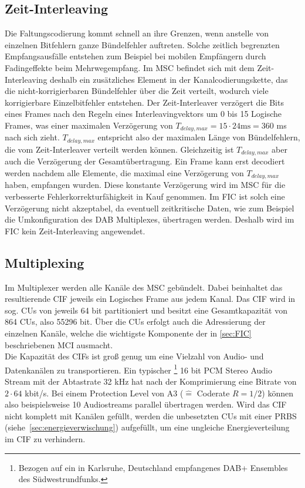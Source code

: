 \subsection{Zeit-Interleaving}
\label{sec:time_interleaving_std}
Die Faltungscodierung kommt schnell an ihre Grenzen, wenn anstelle von einzelnen Bitfehlern ganze Bündelfehler auftreten. Solche zeitlich begrenzten Empfangsausfälle entstehen zum Beispiel bei mobilen Empfängern durch Fadingeffekte beim Mehrwegempfang. Im \ac{MSC} befindet sich mit dem Zeit-Interleaving deshalb ein zusätzliches Element in der Kanalcodierungskette, das die nicht-korrigierbaren Bündelfehler über die Zeit verteilt, wodurch viele korrigierbare Einzelbitfehler entstehen. Der Zeit-Interleaver verzögert die Bits eines Frames nach den Regeln eines Interleavingvektors um 0 bis 15 Logische Frames, was einer maximalen Verzögerung von $T_{delay, max} = 15 \cdot 24 \text{ms} = 360$ ms nach sich zieht. $T_{delay, max}$ entspricht also der maximalen Länge von Bündelfehlern, die vom Zeit-Interleaver verteilt werden können. Gleichzeitig ist $T_{delay, max}$ aber auch die Verzögerung der Gesamtübertragung. Ein Frame kann erst decodiert werden nachdem alle Elemente, die maximal eine Verzögerung von $T_{delay, max}$ haben, empfangen wurden. Diese konstante Verzögerung wird im MSC für die verbesserte Fehlerkorrekturfähigkeit in Kauf genommen. Im FIC ist solch eine Verzögerung nicht akzeptabel, da eventuell zeitkritische Daten, wie zum Beispiel die Umkonfiguration des DAB Multiplexes, übertragen werden. Deshalb wird im FIC kein Zeit-Interleaving angewendet.

\subsection{Multiplexing}
\label{sec:MUX}
Im Multiplexer werden alle Kanäle des MSC gebündelt. Dabei beinhaltet das resultierende \ac{CIF} jeweils ein Logisches Frame aus jedem Kanal. Das CIF wird in sog. \acp{CU} von jeweils 64 bit partitioniert und besitzt eine Gesamtkapazität von 864 \acp{CU}, also 55296 bit. Über die \acp{CU} erfolgt auch die Adressierung der einzelnen Kanäle, welche die wichtigste Komponente der in \ref{sec:FIC} beschriebenen \ac{MCI} ausmacht.\\
Die Kapazität des CIFs ist groß genug um eine Vielzahl von Audio- und Datenkanälen zu transportieren. Ein typischer \footnote{Bezogen auf ein in Karlsruhe, Deutschland empfangenes DAB+ Ensembles des Südwestrundfunks.} 16 bit PCM Stereo Audio Stream mit der Abtastrate 32 kHz hat nach der Komprimierung eine Bitrate von $2\cdot64$ kbit/s. Bei einem Protection Level von A3 ($\hat{=}$ Coderate $R=1/2$) können also beispielsweise 10 Audiostreams parallel übertragen werden.
Wird das CIF nicht komplett mit Kanälen gefüllt, werden die unbesetzten CUs mit einer \ac{PRBS} (siehe~\ref{sec:energieverwischung}) aufgefüllt, um eine ungleiche Energieverteilung im CIF zu verhindern.

